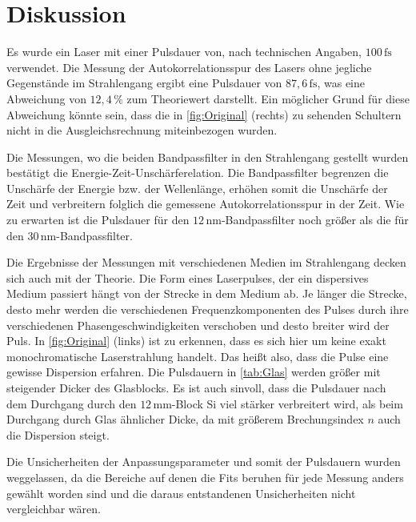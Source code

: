 \newpage
\section{Diskussion}
\label{sec:disskussion}

Es wurde ein Laser mit einer Pulsdauer von, nach technischen Angaben, $100\,\si{\femto\second}$ verwendet.
Die Messung der Autokorrelationsspur des Lasers ohne jegliche Gegenstände im Strahlengang ergibt eine Pulsdauer von $87,6\,\si{\femto\second}$, was eine Abweichung von $12,4\,\%$ zum Theoriewert darstellt.
Ein möglicher Grund für diese Abweichung könnte sein, dass die in \autoref{fig:Original} (rechts) zu sehenden Schultern nicht in die Ausgleichsrechnung miteinbezogen wurden.

Die Messungen, wo die beiden Bandpassfilter in den Strahlengang gestellt wurden bestätigt die Energie-Zeit-Unschärferelation.
Die Bandpassfilter begrenzen die Unschärfe der Energie bzw. der Wellenlänge, erhöhen somit die Unschärfe der Zeit und verbreitern folglich die gemessene Autokorrelationsspur in der Zeit.
Wie zu erwarten ist die Pulsdauer für den $12\,\si{\nano\meter}$-Bandpassfilter noch größer als die für den $30\,\si{\nano\meter}$-Bandpassfilter.


Die Ergebnisse der Messungen mit verschiedenen Medien im Strahlengang decken sich auch mit der Theorie.
Die Form eines Laserpulses, der ein dispersives Medium passiert hängt von der Strecke in dem Medium ab.
Je länger die Strecke, desto mehr werden die verschiedenen Frequenzkomponenten des Pulses durch ihre verschiedenen Phasengeschwindigkeiten verschoben und desto breiter wird der Puls.
In \autoref{fig:Original} (links) ist zu erkennen, dass es sich hier um keine exakt monochromatische Laserstrahlung handelt.
Das heißt also, dass die Pulse eine gewisse Dispersion erfahren.
Die Pulsdauern in \autoref{tab:Glas} werden größer mit steigender Dicker des Glasblocks.
Es ist auch sinvoll, dass die Pulsdauer nach dem Durchgang durch den $12\,\si{\milli\meter}$-Block Si viel stärker verbreitert wird, als beim Durchgang durch Glas ähnlicher Dicke, da mit größerem Brechungsindex $n$ auch die Dispersion steigt.

Die Unsicherheiten der Anpassungsparameter und somit der Pulsdauern wurden weggelassen, da die Bereiche auf denen die Fits beruhen für jede Messung anders gewählt worden sind und die daraus entstandenen Unsicherheiten nicht vergleichbar wären.


